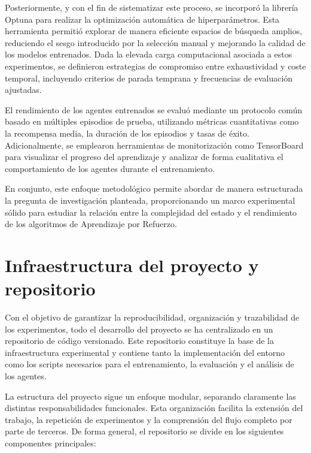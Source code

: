 Posteriormente, y con el fin de sistematizar este proceso, se incorporó la librería Optuna para realizar la optimización automática de hiperparámetros. Esta herramienta permitió explorar de manera eficiente espacios de búsqueda amplios, reduciendo el sesgo introducido por la selección manual y mejorando la calidad de los modelos entrenados. Dada la elevada carga computacional asociada a estos experimentos, se definieron estrategias de compromiso entre exhaustividad y coste temporal, incluyendo criterios de parada temprana y frecuencias de evaluación ajustadas.

El rendimiento de los agentes entrenados se evaluó mediante un protocolo común basado en múltiples episodios de prueba, utilizando métricas cuantitativas como la recompensa media, la duración de los episodios y tasas de éxito. Adicionalmente, se emplearon herramientas de monitorización como TensorBoard para visualizar el progreso del aprendizaje y analizar de forma cualitativa el comportamiento de los agentes durante el entrenamiento.

En conjunto, este enfoque metodológico permite abordar de manera estructurada la pregunta de investigación planteada, proporcionando un marco experimental sólido para estudiar la relación entre la complejidad del estado y el rendimiento de los algoritmos de Aprendizaje por Refuerzo.

\section{Infraestructura del proyecto y repositorio}

Con el objetivo de garantizar la reproducibilidad, organización y trazabilidad de los experimentos, todo el desarrollo del proyecto se ha centralizado en un repositorio de código versionado. Este repositorio constituye la base de la infraestructura experimental y contiene tanto la implementación del entorno como los scripts necesarios para el entrenamiento, la evaluación y el análisis de los agentes.

La estructura del proyecto sigue un enfoque modular, separando claramente las distintas responsabilidades funcionales. Esta organización facilita la extensión del trabajo, la repetición de experimentos y la comprensión del flujo completo por parte de terceros. De forma general, el repositorio se divide en los siguientes componentes principales:

